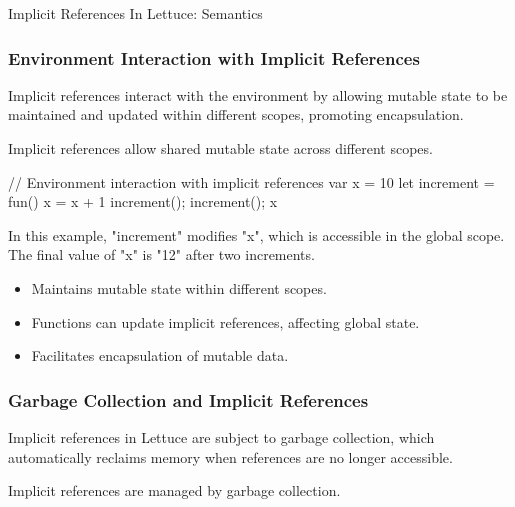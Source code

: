 \begin{notes}{Implicit References In Lettuce: Semantics}
\begin{highlight}
    \end{highlight}
    
    \subsubsection*{Environment Interaction with Implicit References}
    
    Implicit references interact with the environment by allowing mutable state to be maintained and updated within different scopes, promoting encapsulation.
    
    \begin{highlight}
    
        Implicit references allow shared mutable state across different scopes.
    
    \begin{code}[Lettuce]
    // Environment interaction with implicit references
    var x = 10
    let increment = fun() {
        x = x + 1
    }
    increment(); increment(); x
    \end{code}
    
        In this example, "increment" modifies "x", which is accessible in the global scope. The final value of "x" is "12" after two increments.
    
        \begin{itemize}
            \item Maintains mutable state within different scopes.
            \item Functions can update implicit references, affecting global state.
            \item Facilitates encapsulation of mutable data.
        \end{itemize}
    
    \end{highlight}
    
    \subsubsection*{Garbage Collection and Implicit References}
    
    Implicit references in Lettuce are subject to garbage collection, which automatically reclaims memory when references are no longer accessible.
    
    \begin{highlight}
    
        Implicit references are managed by garbage collection.
    

\end{highlight}
\end{notes}
